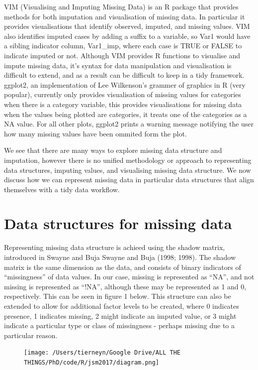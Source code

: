 \documentclass[]{article}
\begin{document}
VIM (Visualising and Imputing Missing Data) is an R package that
provides methods for both imputation and visualisation of missing data.
In particular it provides visualisations that identify observed,
imputed, and missing values. VIM also identifies imputed cases by adding
a suffix to a variable, so Var1 would have a sibling indicator column,
Var1\_imp, where each case is TRUE or FALSE to indicate imputed or not.
Although VIM provides R functions to visualise and impute missing data,
it's syntax for data manipulation and visualisation is difficult to
extend, and as a result can be difficult to keep in a tidy framework.
ggplot2, an implementation of Lee Wilkenson's grammer of graphics in R
(very popular), currently only provides visualisation of missing values
for categories when there is a category variable, this provides
visualisations for missing data when the values being plotted are
categories, it treats one of the categories as a NA value. For all other
plots, ggplot2 prints a warning message notifying the user how many
missing values have been ommited form the plot.

We see that there are many ways to explore missing data structure and
imputation, however there is no unified methodology or approach to
representing data structures, imputing values, and visualising missing
data structure. We now discuss how we can represent missing data in
particular data structures that align themselves with a tidy data
workflow.

\section{Data structures for missing
data}\label{data-structures-for-missing-data}

Representing missing data structure is achieed using the shadow matrix,
introduced in Swayne and Buja Swayne and Buja (1998; 1998). The shadow
matrix is the same dimension as the data, and consists of binary
indicators of ``missingness'' of data values. In our case, missing is
represented as ``NA'', and not missing is represented as ``!NA'',
although these may be represented as 1 and 0, respectively. This can be
seen in figure 1 below. This structure can also be extended to allow for
additional factor levels to be created, where 0 indicates presence, 1
indicates missing, 2 might indicate an imputed value, or 3 might
indicate a particular type or class of missingness - perhaps missing due
to a particular reason.

\begin{figure}[h]
\centering
\texttt{[image: /Users/tierneyn/Google Drive/ALL THE THINGS/PhD/code/R/jsm2017/diagram.png]}
\end{figure}
\end{document}
